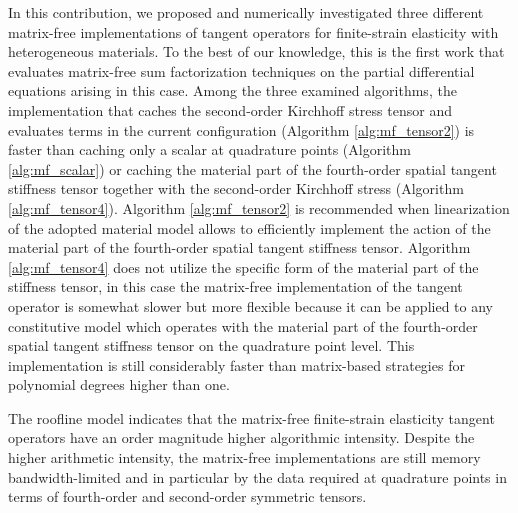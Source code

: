 \documentclass[AMA,STIX1COL]{WileyNJD-v2}
\begin{document}
In this contribution, we proposed and numerically investigated three different matrix-free implementations of tangent operators for finite-strain elasticity with heterogeneous materials.
To the best of our knowledge, this is the first work that evaluates matrix-free sum factorization techniques on the partial differential equations arising in this case.
Among the three examined algorithms,
the implementation that caches the second-order Kirchhoff stress tensor and evaluates terms in the current configuration ({\color{red}Algorithm \ref{alg:mf_tensor2}}) is faster than
caching only a scalar at quadrature points ({\color{red}Algorithm \ref{alg:mf_scalar}}) or caching the material part of the fourth-order spatial tangent stiffness tensor together with the second-order Kirchhoff stress ({\color{red}Algorithm \ref{alg:mf_tensor4}}).
{\color{red}
Algorithm \ref{alg:mf_tensor2} is recommended when linearization of the adopted material model allows to efficiently implement the action of the material part of the fourth-order spatial tangent stiffness tensor.
Algorithm \ref{alg:mf_tensor4} does
}
not utilize the specific form of the material part of the stiffness tensor,
{\color{red}
in this case
}
the matrix-free implementation of the tangent operator is somewhat slower but more flexible because it can be applied to any constitutive model which
operates with the material part of the fourth-order spatial tangent stiffness tensor on the quadrature point level.
{\color{red}
This implementation is still considerably faster than matrix-based strategies for polynomial degrees higher than one.
}

The roofline model indicates that the matrix-free finite-strain elasticity tangent operators have an order magnitude higher algorithmic intensity.
Despite the higher arithmetic intensity, the matrix-free implementations are still memory bandwidth-limited and in particular by the data
required at quadrature points in terms of fourth-order and second-order symmetric tensors.
\end{document}
